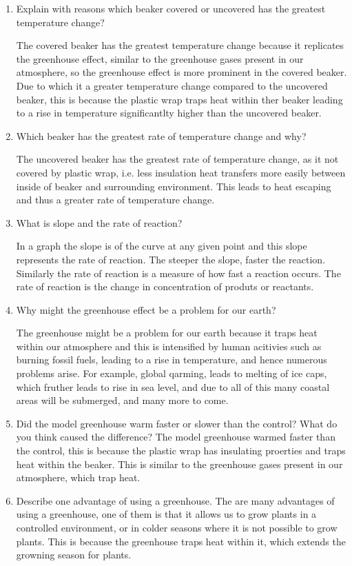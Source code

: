 \documentclass[a4paper, 12pt, english]{article}
\begin{document}
\begin{enumerate}
    \item Explain with reasons which beaker covered or uncovered has the greatest temperature change?
    
	The covered beaker has the greatest temperature change because it replicates the greenhouse effect, similar to 
	the greenhouse gases present in our atmosphere, so the greenhouse effect is more prominent in the covered beaker. Due 
	to which it a greater temperature change compared to the uncovered beaker, this is because the plastic wrap traps 
	heat within ther beaker leading to a rise in temperature significantlty higher than the uncovered beaker.
    \item Which beaker has the greatest rate of temperature change and why?
    
	The  uncovered beaker has the greatest rate of temperature change, as it not covered by plastic wrap, i.e. less insulation
	heat transfers more easily between inside of beaker and surrounding environment. This leads to heat escaping 
	and thus a greater rate of temperature change.
    \item What is slope and the rate of reaction?
    
    In a graph the slope is of the curve at any given point and this slope represents the rate
	of reaction. The steeper the slope, faster the reaction. Similarly the rate of reaction
	is a measure of how fast a reaction occurs. The rate of reaction is the change in concentration of produts or reactants.	
	\item Why might the greenhouse effect be a problem for our earth?
	
	The greenhouse might be a problem for our earth because it traps heat within our atmosphere and this is 
	intensified by human acitivies such as burning fossil fuels, leading to a rise in temperature, and 
	hence numerous problems arise. For example, global qarming, leads to melting of ice caps, which fruther leads to
	rise in sea level, and due to all of this many coastal areas will be submerged, and many more to come.
    \item Did the model greenhouse warm faster or slower than the control? What do you think caused the difference?
    The model greenhouse warmed faster than the control, this is because the plastic wrap has insulating proerties 
	and traps heat within the beaker. This is similar to the greenhouse gases present in our atmosphere, which trap heat.

	\item Describe one advantage of using a greenhouse.
	The are many advantages of using a greenhouse, one of them is that it allows us to grow plants in a controlled environment,
	or in colder seasons where it is not possible to grow plants. This is because the greenhouse traps heat within it, which
	extends the growning season for plants.
\end{enumerate}
\end{document}
